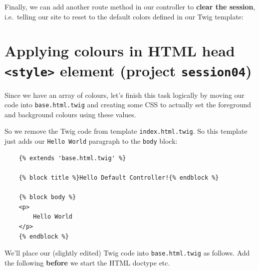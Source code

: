 \documentclass[a4paperpaper,openright]{book}
\newenvironment{Shaded}{}{}
\newcommand{\AnnotationTok}[1]{\textcolor[rgb]{0.38,0.63,0.69}{\textbf{\textit{#1}}}}
\newcommand{\CommentTok}[1]{\textcolor[rgb]{0.38,0.63,0.69}{\textit{#1}}}
\newcommand{\KeywordTok}[1]{\textcolor[rgb]{0.00,0.44,0.13}{\textbf{#1}}}
\newcommand{\NormalTok}[1]{#1}
\newcommand{\OtherTok}[1]{\textcolor[rgb]{0.00,0.44,0.13}{#1}}
\newcommand{\StringTok}[1]{\textcolor[rgb]{0.25,0.44,0.63}{#1}}
\begin{document}
Finally, we can add another route method in our controller to
\textbf{clear the session}, i.e.~telling our site to reset to the
default colors defined in our Twig template:

\begin{Shaded}
\end{Shaded}

\hypertarget{applying-colours-in-html-head-style-element-project-session04}{%
\section{\texorpdfstring{Applying colours in HTML head
\texttt{\textless{}style\textgreater{}} element (project
\texttt{session04})}{Applying colours in HTML head \textless{}style\textgreater{} element (project session04)}}\label{applying-colours-in-html-head-style-element-project-session04}}

Since we have an array of colours, let's finish this task logically by
moving our code into \texttt{base.html.twig} and creating some CSS to
actually set the foreground and background colours using these values.

So we remove the Twig code from template \texttt{index.html.twig}. So
this template just adds our \texttt{Hello\ World} paragraph to the
\texttt{body} block:

\begin{verbatim}
    {% extends 'base.html.twig' %}
    
    {% block title %}Hello Default Controller!{% endblock %}
    
    {% block body %}
    <p>
        Hello World
    </p>
    {% endblock %}
\end{verbatim}

We'll place our (slightly edited) Twig code into \texttt{base.html.twig}
as follows. Add the following \textbf{before} we start the HTML doctype
etc.
\end{document}
